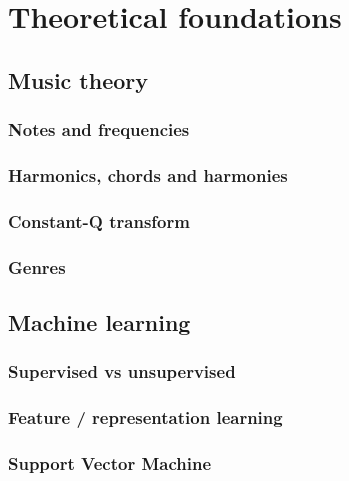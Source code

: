 \documentclass[a4paper,12pt,twoside]{report}
\begin{document}
\part{Theoretical foundations}

\chapter{Music theory}

\section{Notes and frequencies}

\section{Harmonics, chords and harmonies}

\section{Constant-Q transform}

\section{Genres}

\chapter{Machine learning}

\section{Supervised vs unsupervised}

\section{Feature / representation learning}

\section{Support Vector Machine}
\end{document}
